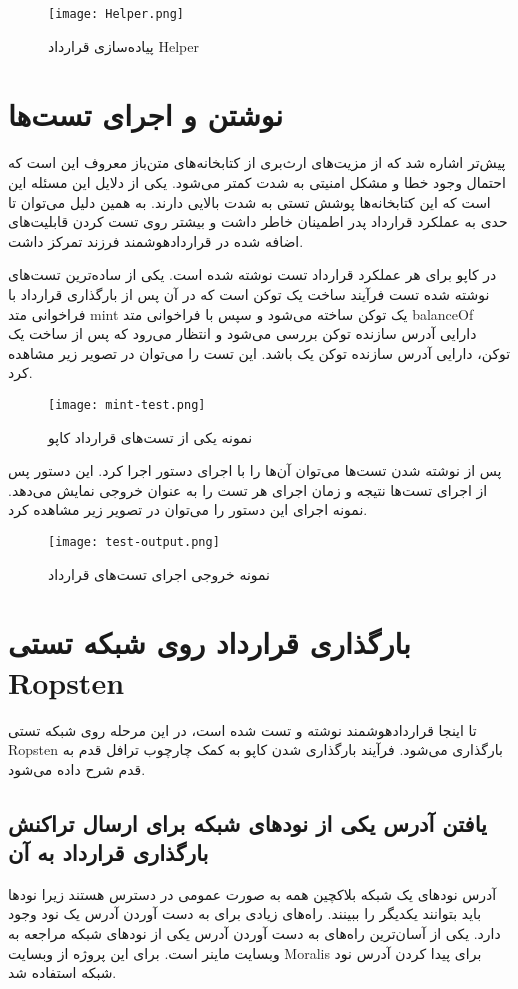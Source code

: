 \begin{figure}[ht]
\centerline{\texttt{[image: Helper.png]}}
\caption{پیاده‌سازی قرارداد Helper}
\label{fig:Helper}
\end{figure}

\section{نوشتن و اجرای تست‌ها}
پیش‌تر اشاره شد که از مزیت‌های ارث‌بری از کتابخانه‌های متن‌باز معروف این است که احتمال وجود خطا و مشکل امنیتی به شدت کمتر می‌شود. یکی از دلایل این مسئله این است که این کتابخانه‌ها پوشش تستی به شدت بالایی دارند. به همین دلیل می‌توان تا حدی به عملکرد قرارداد پدر اطمینان خاطر داشت و بیشتر روی تست کردن قابلیت‌های اضافه شده در قراردادهوشمند فرزند تمرکز داشت.

در کاپو برای هر عملکرد قرارداد تست نوشته شده است. یکی از ساده‌ترین تست‌های نوشته شده تست فرآیند ساخت یک توکن است که در آن پس از بارگذاری قرارداد با فراخوانی متد mint یک توکن ساخته می‌شود و سپس با فراخوانی متد balanceOf دارایی آدرس سازنده توکن بررسی می‌شود و انتظار می‌رود که پس از ساخت یک توکن، دارایی آدرس سازنده توکن یک باشد. این تست را می‌توان در تصویر زیر مشاهده کرد.

\begin{figure}[ht]
\centerline{\texttt{[image: mint-test.png]}}
\caption{نمونه یکی از تست‌های قرارداد کاپو}
\label{fig:mint-test}
\end{figure}

پس از نوشته شدن تست‌ها می‌توان آن‌ها را با اجرای دستور
اجرا کرد. این دستور پس از اجرای تست‌ها نتیجه و زمان اجرای هر تست را به عنوان خروجی نمایش می‌دهد. نمونه اجرای این دستور را می‌توان در تصویر زیر مشاهده کرد.

\begin{figure}[ht]
\centerline{\texttt{[image: test-output.png]}}
\caption{نمونه خروجی اجرای تست‌های قرارداد}
\label{fig:test-output}
\end{figure}

\section{بارگذاری قرارداد روی شبکه تستی Ropsten}
تا اینجا قراردادهوشمند نوشته و تست شده است، در این مرحله روی شبکه تستی Ropsten بارگذاری می‌شود. فرآیند بارگذاری شدن کاپو به کمک چارچوب ترافل قدم به قدم شرح داده می‌شود.

\subsection{یافتن آدرس یکی از نود‌های شبکه برای ارسال تراکنش بارگذاری قرارداد به آن}
آدرس نود‌های یک شبکه بلاکچین همه به صورت عمومی در دسترس هستند زیرا نودها باید بتوانند یکدیگر را ببینند. راه‌های زیادی برای به دست آوردن آدرس یک نود وجود دارد. یکی از آسان‌ترین راه‌های به دست آوردن آدرس یکی از نود‌های شبکه مراجعه به وبسایت ماینر است. برای این پروژه از وبسایت Moralis
برای پیدا کردن آدرس نود شبکه استفاده شد.

